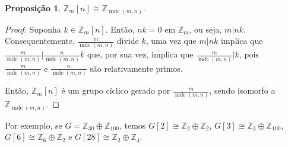 \documentclass[a4paper,portuguese,11pt,twoside, leqno]{book}
\DeclareMathOperator{\mdc}{mdc}
\theoremstyle{definition}
\newtheorem{prop}{Proposição}[section]
\begin{document}
	\begin{prop}
		\label{regra G[n]}
		$\mathbb{Z}_m[n]\cong \mathbb{Z}_{\mdc(m,n)}$.
	\end{prop}
	\begin{proof}
		Suponha $k\in \mathbb{Z}_m[n]$. Então, $nk = 0$ em $\mathbb{Z}_m$, ou seja, $m|nk$. Consequentemente, $\displaystyle{ \frac{m}{\mdc(m,n)} }$ divide $k$, uma vez que $m|nk$ implica que $\displaystyle{ \frac{m}{\mdc(m,n)} \Bigg| \frac{n}{\mdc(m,n)}k  }$ que, por sua vez, implica que $\displaystyle{ \frac{m}{\mdc(m,n)} }\Bigg| k$, pois $\displaystyle{ \frac{m}{\mdc(m,n)}\text{ e }\frac{n}{\mdc(m,n)}  }$ são relativamente primos.
		\par\vspace{0.3cm} Então, $\mathbb{Z}_m[n]$ é um grupo cíclico gerado por $\displaystyle{\frac{m}{\mdc(m,n)}}$, sendo isomorfo a $\mathbb{Z}_{\mdc(m,n)}$.
	\end{proof}
	\par\vspace{0.3cm} Por exemplo, se $G = \mathbb{Z}_{30}\oplus\mathbb{Z}_{100}$, temos $G[2]\cong \mathbb{Z}_2\oplus\mathbb{Z}_2$, $G[3]\cong \mathbb{Z}_3\oplus\mathbb{Z}_{100}$, $G[6]\cong \mathbb{Z}_6\oplus\mathbb{Z}_2$ e $G[28]\cong \mathbb{Z}_{2}\oplus\mathbb{Z}_4$.
	
\end{document}
